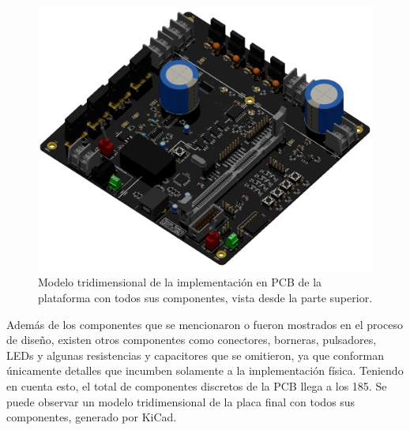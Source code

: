 \begin{figure}[h]
    \centering
    \includegraphics[scale=0.3]{Imagenes/PCB 3D Raytracing.png}
    \caption{Modelo tridimensional de la implementación en PCB de la plataforma con todos sus componentes, vista desde la parte superior.}
    \label{pcb_3d}
\end{figure}

Además de los componentes que se mencionaron o fueron mostrados en el proceso de diseño, existen otros componentes como conectores, borneras, pulsadores, LEDs y algunas resistencias y capacitores que se omitieron, ya que conforman únicamente detalles que incumben solamente a la implementación física. Teniendo en cuenta esto, el total de componentes discretos de la PCB llega a los 185. Se puede observar un modelo tridimensional de la placa final con todos sus componentes, generado por KiCad.\\



\newpage



\newpage



\newpage



\afterpage{\blankpage}\newpage
